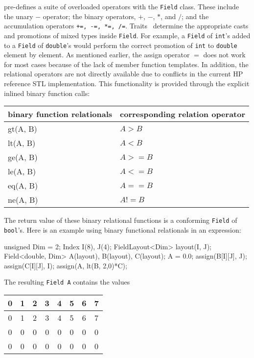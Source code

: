 \ippl pre-defines a suite of overloaded operators with the \texttt{Field} class. These include the unary $-$ operator; the binary operators, $+$, $-$, $*$, and $/$; and the accumulation operators \texttt{+=, -=, *=, /=}. Traits~\cite{traits} determine the appropriate casts and promotions of mixed types inside \texttt{Field}. For example, a \texttt{Field} of \texttt{int}'s added to a \texttt{Field} of \texttt{double}'s would perform the correct promotion of \texttt{int} to \texttt{double} element by element. As mentioned earlier, the assign operator $=$ does not work
for most cases because of the lack of member function templates. In addition, the relational operators are not directly available due to conflicts in the current HP reference STL implementation. This functionality is provided through the explicit inlined binary function calls:
%
   \begin{center}
        \begin{tabular}{ll}
        \hline
        binary function relationals & corresponding relation operator \\
        \hline
        gt(A, B) & $A > B$ \\ 
        lt(A, B) & $A < B$ \\ 
        ge(A, B) & $A >= B$ \\ 
        le(A, B) & $A  <= B$ \\ 
        eq(A, B) & $A == B$ \\
        ne(A, B) & $A != B$ \\
        \hline
        \end{tabular}
   \end{center}
%
The return value of these binary relational functions is a conforming \texttt{Field} of \texttt{bool}'s. Here is an example using binary functional relationals in an expression: \\
\begin{code}
unsigned Dim = 2;
Index I(8), J(4);
FieldLayout<Dim> layout(I, J);
Field<double, Dim> A(layout), B(layout), C(layout);
A = 0.0;
assign(B[I][J], J);
assign(C[I][J], I);
assign(A, lt(B, 2,0)*C);
\end{code}
The resulting \texttt{Field A} contains the values
%
   \begin{center}
        \begin{tabular}{|c|c|c|c|c|c|c|c|}
        \hline
        0 & 1 & 2 & 3 & 4 & 5 & 6 & 7\\        \hline
        0 & 1 & 2 & 3 & 4 & 5 & 6 & 7\\        \hline
        0 & 0 & 0 & 0 & 0 & 0 & 0 & 0\\        \hline
        0 & 0 & 0 & 0 & 0 & 0 & 0 & 0\\        \hline
        \end{tabular}
   \end{center}

